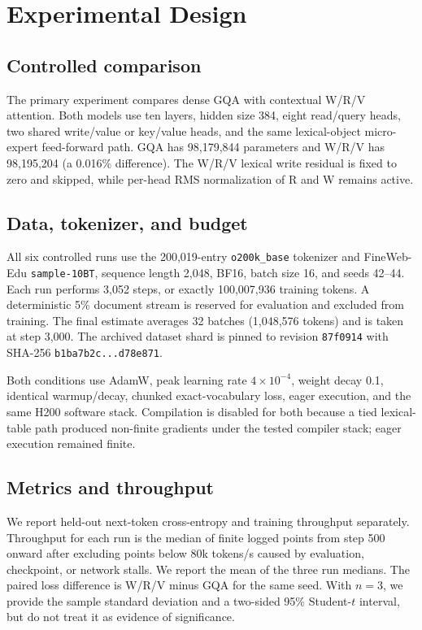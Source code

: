 \section{Experimental Design}
\label{sec:experiments}

\subsection{Controlled comparison}

The primary experiment compares dense GQA with contextual W/R/V attention. Both models use ten layers, hidden size 384, eight read/query heads, two shared write/value or key/value heads, and the same lexical-object micro-expert feed-forward path. GQA has 98,179,844 parameters and W/R/V has 98,195,204 (a 0.016\% difference). The W/R/V lexical write residual is fixed to zero and skipped, while per-head RMS normalization of R and W remains active.

\subsection{Data, tokenizer, and budget}

All six controlled runs use the 200,019-entry \texttt{o200k\_base} tokenizer and FineWeb-Edu \texttt{sample-10BT}, sequence length 2,048, BF16, batch size 16, and seeds 42--44. Each run performs 3,052 steps, or exactly 100,007,936 training tokens. A deterministic 5\% document stream is reserved for evaluation and excluded from training. The final estimate averages 32 batches (1,048,576 tokens) and is taken at step 3,000. The archived dataset shard is pinned to revision \texttt{87f0914} with SHA-256 \texttt{b1ba7b2c...d78e871}.

Both conditions use AdamW, peak learning rate $4\times10^{-4}$, weight decay 0.1, identical warmup/decay, chunked exact-vocabulary loss, eager execution, and the same H200 software stack. Compilation is disabled for both because a tied lexical-table path produced non-finite gradients under the tested compiler stack; eager execution remained finite.

\subsection{Metrics and throughput}

We report held-out next-token cross-entropy and training throughput separately. Throughput for each run is the median of finite logged points from step 500 onward after excluding points below 80k tokens/s caused by evaluation, checkpoint, or network stalls. We report the mean of the three run medians. The paired loss difference is W/R/V minus GQA for the same seed. With $n=3$, we provide the sample standard deviation and a two-sided 95\% Student-$t$ interval, but do not treat it as evidence of significance.


